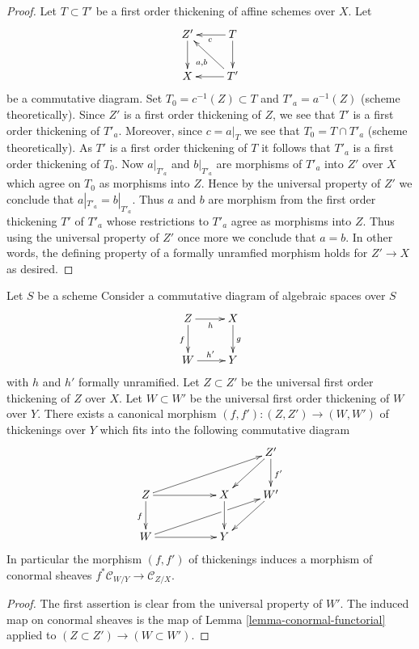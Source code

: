 \begin{proof}
Let $T \subset T'$ be a first order thickening of affine schemes over $X$.
Let
$$
\xymatrix{
Z' \ar[d] & T \ar[l]^c \ar[d] \\
X & T' \ar[l] \ar[lu]^{a, b}
}
$$
be a commutative diagram. Set $T_0 = c^{-1}(Z) \subset T$ and
$T'_a = a^{-1}(Z)$ (scheme theoretically).
Since $Z'$ is a first order thickening of $Z$, we see that $T'$
is a first order thickening of $T'_a$. Moreover, since $c = a|_T$ we see that
$T_0 = T \cap T'_a$ (scheme theoretically). As $T'$ is a first order
thickening of $T$ it follows that $T'_a$
is a first order thickening of $T_0$. Now $a|_{T'_a}$ and $b|_{T'_a}$
are morphisms of $T'_a$ into $Z'$ over $X$ which agree on $T_0$ as
morphisms into $Z$. Hence by the universal property of $Z'$ we conclude that
$a|_{T'_a} = b|_{T'_a}$. Thus $a$ and $b$ are morphism from
the first order thickening $T'$ of $T'_a$ whose restrictions to
$T'_a$ agree as morphisms into $Z$. Thus using the universal property of
$Z'$ once more we conclude that $a = b$. In other words, the defining
property of a formally unramfied morphism holds for $Z' \to X$ as desired.
\end{proof}

\begin{lemma}
\label{lemma-universal-thickening-functorial}
Let $S$ be a scheme
Consider a commutative diagram of algebraic spaces over $S$
$$
\xymatrix{
Z \ar[r]_h \ar[d]_f & X \ar[d]^g \\
W \ar[r]^{h'} & Y
}
$$
with $h$ and $h'$ formally unramified. Let $Z \subset Z'$ be the universal
first order thickening of $Z$ over $X$. Let $W \subset W'$ be the universal
first order thickening of $W$ over $Y$. There exists a canonical morphism
$(f, f') : (Z, Z') \to (W, W')$ of thickenings over $Y$ which fits into
the following commutative diagram
$$
\xymatrix{
& & & Z' \ar[ld] \ar[d]^{f'} \\
Z \ar[rr] \ar[d]_f \ar[rrru] & & X \ar[d] & W' \ar[ld] \\
W \ar[rrru]|!{[rr];[rruu]}\hole \ar[rr] & & Y
}
$$
In particular the morphism $(f, f')$ of thickenings induces a morphism
of conormal sheaves $f^*\mathcal{C}_{W/Y} \to \mathcal{C}_{Z/X}$.
\end{lemma}

\begin{proof}
The first assertion is clear from the universal property of $W'$.
The induced map on conormal sheaves is the map of
Lemma \ref{lemma-conormal-functorial}
applied to $(Z \subset Z') \to (W \subset W')$.
\end{proof}

